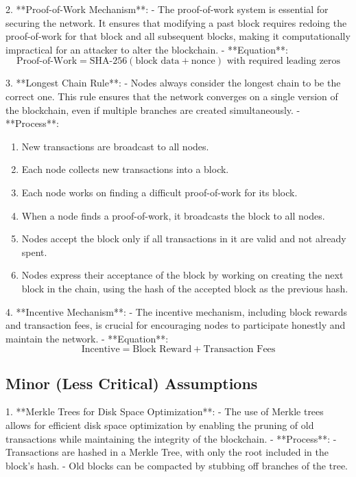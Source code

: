 \documentclass{article}
\begin{document}
2. **Proof-of-Work Mechanism**:
   - The proof-of-work system is essential for securing the network. It ensures that modifying a past block requires redoing the proof-of-work for that block and all subsequent blocks, making it computationally impractical for an attacker to alter the blockchain.
   - **Equation**:
     \[
     \text{Proof-of-Work} = \text{SHA-256}( \text{block data} + \text{nonce} ) \text{ with required leading zeros}
     \]

3. **Longest Chain Rule**:
   - Nodes always consider the longest chain to be the correct one. This rule ensures that the network converges on a single version of the blockchain, even if multiple branches are created simultaneously.
   - **Process**:
     \begin{enumerate}
     \item New transactions are broadcast to all nodes.
     \item Each node collects new transactions into a block.
     \item Each node works on finding a difficult proof-of-work for its block.
     \item When a node finds a proof-of-work, it broadcasts the block to all nodes.
     \item Nodes accept the block only if all transactions in it are valid and not already spent.
     \item Nodes express their acceptance of the block by working on creating the next block in the chain, using the hash of the accepted block as the previous hash.
     \end{enumerate}

4. **Incentive Mechanism**:
   - The incentive mechanism, including block rewards and transaction fees, is crucial for encouraging nodes to participate honestly and maintain the network.
   - **Equation**:
     \[
     \text{Incentive} = \text{Block Reward} + \text{Transaction Fees}
     \]

\subsection{Minor (Less Critical) Assumptions}

1. **Merkle Trees for Disk Space Optimization**:
   - The use of Merkle trees allows for efficient disk space optimization by enabling the pruning of old transactions while maintaining the integrity of the blockchain.
   - **Process**:
     - Transactions are hashed in a Merkle Tree, with only the root included in the block's hash.
     - Old blocks can be compacted by stubbing off branches of the tree.
\end{document}
